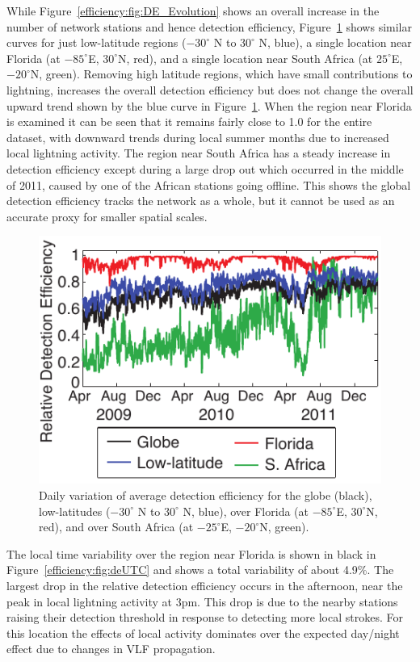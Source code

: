While Figure~\ref{efficiency:fig:DE_Evolution} shows an overall increase in the number of network stations and hence detection efficiency, Figure~\ref{efficiency:fig:deTrendLocal} shows similar curves for just low-latitude regions ($-30^\circ$ N to $30^\circ$ N, blue), a single location near Florida (at $-85^\circ$E, $30^\circ$N, red), and a single location near South Africa (at $25^\circ$E, $-20^\circ$N, green).
Removing high latitude regions, which have small contributions to lightning, increases the overall detection efficiency but does not change the overall upward trend shown by the blue curve in Figure~\ref{efficiency:fig:deTrendLocal}.
When the region near Florida is examined it can be seen that it remains fairly close to 1.0 for the entire dataset, with downward trends during local summer months due to increased local lightning activity.
The region near South Africa has a steady increase in detection efficiency except during a large drop out which occurred in the middle of 2011, caused by one of the African stations going offline.
This shows the global detection efficiency tracks the network as a whole, but it cannot be used as an accurate proxy for smaller spatial scales.

\begin{figure}[ht!]
   \centering
\noindent\includegraphics[scale=1]{efficiency/Figures/2012RS005049-p10.pdf}
   \caption{Daily variation of average detection efficiency for the globe (black), low-latitudes ($-30^\circ$ N to $30^\circ$ N, blue), over Florida (at $-85^\circ$E, $30^\circ$N, red), and over South Africa (at $-25^\circ$E, $-20^\circ$N, green).}
   \label{efficiency:fig:deTrendLocal}
\end{figure}

The local time variability over the region near Florida is shown in black in Figure~\ref{efficiency:fig:deUTC} and shows a total variability of about 4.9\%.
The largest drop in the relative detection efficiency occurs in the afternoon, near the peak in local lightning activity at 3pm.
This drop is due to the nearby stations raising their detection threshold in response to detecting more local strokes.
For this location the effects of local activity dominates over the expected day/night effect due to changes in VLF propagation.

